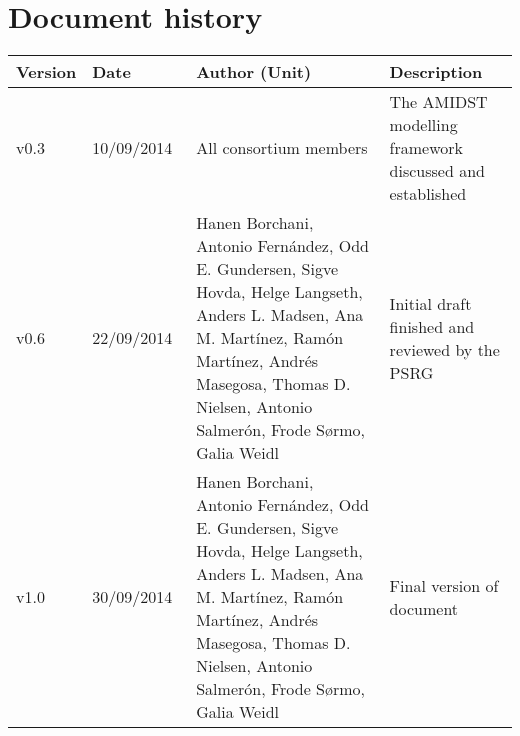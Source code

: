 \documentclass[11pt, oneside]{article}   	%
\numberwithin{figure}{section}
\numberwithin{equation}{section}
\numberwithin{table}{section}
\begin{document}
%
%

\newpage\null\thispagestyle{empty}\newpage

\tableofcontents

\newpage


\section*{Document history}

\begin{table}[htbp]
  \centering
  \begin{tabularx}{\linewidth}{|p{13mm}| p{18mm}| X | X |} \hline
    {\bf Version} & {\bf Date} & {\bf Author (Unit)} & {\bf Description} \\ \hline
    v0.3 & 10/09/2014~ & All consortium members & The AMIDST modelling framework discussed and established \\ \hline
    v0.6 & 22/09/2014~ & Hanen Borchani, Antonio Fern\'andez, Odd E. Gundersen, Sigve Hovda, Helge Langseth, Anders L. Madsen, Ana M. Mart\'inez, Ram\'on Mart\'inez, Andr\'es Masegosa, Thomas D. Nielsen, Antonio Salmer\'on, Frode S{\o}rmo, Galia Weidl & Initial draft finished and reviewed by the PSRG  \\ \hline
    v1.0 & 30/09/2014~ & Hanen Borchani, Antonio Fern\'andez, Odd E. Gundersen, Sigve Hovda, Helge Langseth, Anders L. Madsen, Ana M. Mart\'inez, Ram\'on Mart\'inez, Andr\'es Masegosa, Thomas D. Nielsen, Antonio Salmer\'on, Frode S{\o}rmo, Galia Weidl & Final version of document  \\ \hline
  \end{tabularx}
\end{table}

\newpage







\newpage






%


\end{document}
